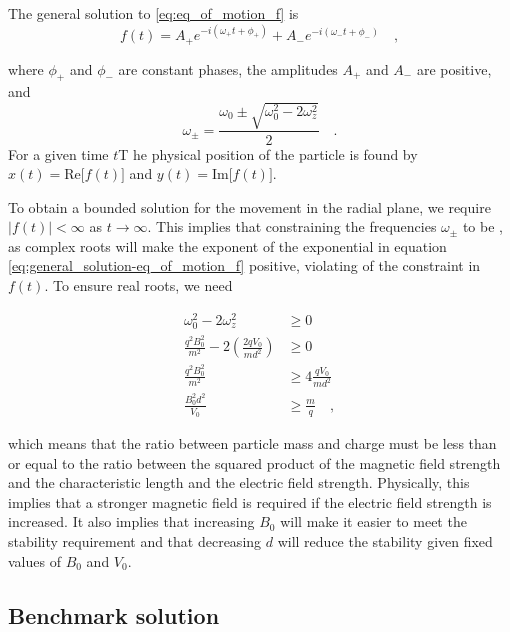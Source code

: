 \documentclass[../main_proj3.tex]{subfiles}
\begin{document}
The general solution to \eqref{eq:eq_of_motion_f} is 
\begin{equation}
\label{eq:general_solution-eq_of_motion_f}
    f(t) = A_+ e^{-i(\omega_+ t + \phi_+)} + A_- e^{-i(\omega_- t + \phi_-)} \quad ,
\end{equation}

where $\phi_+$ and $\phi_-$ are constant phases, the amplitudes $A_+$ and $A_-$ are positive, and 
$$
\omega_\pm = \frac{\omega_0 \pm \sqrt{\omega_0^2 - 2\omega_z^2}}{2} \quad.
$$
For a given time $t$T he physical position of the particle is found by $x(t) = \text{Re}\big[f(t)\big]$ and $y(t) = \text{Im} \big[f(t)\big]$.

To obtain a bounded solution for the movement in the radial plane, we require $|f(t)| < \infty$ as $t\to \infty$. This implies that constraining the frequencies $\omega_\pm$ to be , as complex roots will make the exponent of the exponential in equation \eqref{eq:general_solution-eq_of_motion_f} positive, violating of the constraint in $f(t)$. To ensure real roots, we need 

\begin{equation}
\label{eq:frequency_constraint}
\begin{split}
    \omega_0^{2} - 2\omega_z^{2} &\geq 0 \\ 
    \frac{q^{2}B_0^{2}}{m^{2}} - 2\left(\frac{2qV_0}{md^{2}}\right) & \geq 0 \\
    \frac{q^{2}B_0^{2}}{m^{2}} & \geq 4 \frac{qV_0}{md^{2}} \\
    \frac{B_0^{2}d^{2}}{V_0} &\geq \frac{m}{q} \quad ,
\end{split}
\end{equation}

which means that the ratio between particle mass and charge must be less than or equal to the ratio between the squared product of the magnetic field strength and the characteristic length and the electric field strength. Physically, this implies that a stronger magnetic field is required if the electric field strength is increased. It also implies that increasing $B_0$ will make it easier to meet the stability requirement and that decreasing $d$ will reduce the stability given fixed values of $B_0$ and $V_0$.  



\subsection{Benchmark solution}
\end{document}
